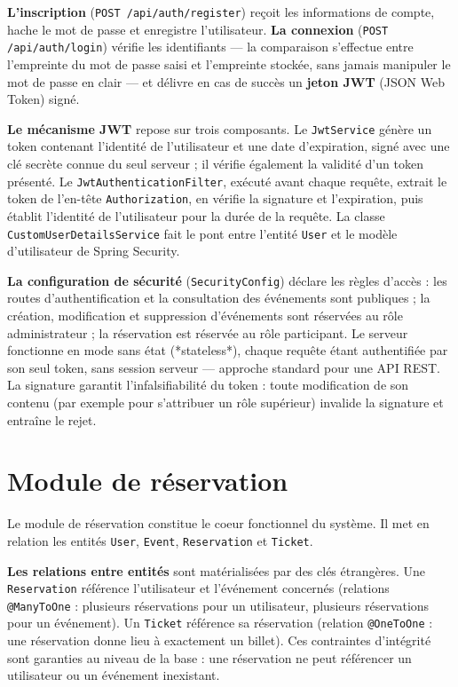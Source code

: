 \documentclass[12pt,a4paper]{report}
\newcommand{\code}[1]{\textcolor{codecolor}{\texttt{#1}}}
\begin{document}
\textbf{L'inscription} (\code{POST /api/auth/register}) reçoit les informations de compte, hache le mot de passe et enregistre l'utilisateur. \textbf{La connexion} (\code{POST /api/auth/login}) vérifie les identifiants — la comparaison s'effectue entre l'empreinte du mot de passe saisi et l'empreinte stockée, sans jamais manipuler le mot de passe en clair — et délivre en cas de succès un \textbf{jeton JWT} (JSON Web Token) signé.

\textbf{Le mécanisme JWT} repose sur trois composants. Le \code{JwtService} génère un token contenant l'identité de l'utilisateur et une date d'expiration, signé avec une clé secrète connue du seul serveur ; il vérifie également la validité d'un token présenté. Le \code{JwtAuthenticationFilter}, exécuté avant chaque requête, extrait le token de l'en-tête \code{Authorization}, en vérifie la signature et l'expiration, puis établit l'identité de l'utilisateur pour la durée de la requête. La classe \code{CustomUserDetailsService} fait le pont entre l'entité \code{User} et le modèle d'utilisateur de Spring Security.

\textbf{La configuration de sécurité} (\code{SecurityConfig}) déclare les règles d'accès : les routes d'authentification et la consultation des événements sont publiques ; la création, modification et suppression d'événements sont réservées au rôle administrateur ; la réservation est réservée au rôle participant. Le serveur fonctionne en mode sans état (*stateless*), chaque requête étant authentifiée par son seul token, sans session serveur — approche standard pour une API REST. La signature garantit l'infalsifiabilité du token : toute modification de son contenu (par exemple pour s'attribuer un rôle supérieur) invalide la signature et entraîne le rejet.

\section{Module de réservation}

Le module de réservation constitue le coeur fonctionnel du système. Il met en relation les entités \code{User}, \code{Event}, \code{Reservation} et \code{Ticket}.

\textbf{Les relations entre entités} sont matérialisées par des clés étrangères. Une \code{Reservation} référence l'utilisateur et l'événement concernés (relations \code{@ManyToOne} : plusieurs réservations pour un utilisateur, plusieurs réservations pour un événement). Un \code{Ticket} référence sa réservation (relation \code{@OneToOne} : une réservation donne lieu à exactement un billet). Ces contraintes d'intégrité sont garanties au niveau de la base : une réservation ne peut référencer un utilisateur ou un événement inexistant.
\end{document}
